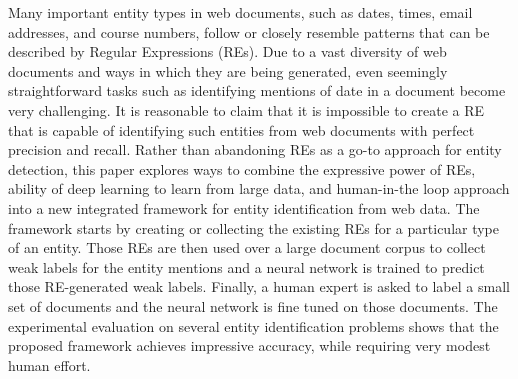Many important entity types in web documents, such as dates, times, email addresses, and course numbers, follow or closely resemble patterns that can be described by Regular Expressions (REs).  Due to a vast diversity of web documents and ways in which they are being generated, even seemingly straightforward tasks such as identifying mentions of date in a document become very challenging. It is reasonable to claim that it is impossible to create a RE that is capable of identifying such entities from web documents with perfect precision and recall. Rather than abandoning REs as a go-to approach for entity detection, this paper explores ways to combine the expressive power of REs, ability of deep learning to learn from large data, and human-in-the loop approach into a new integrated framework for entity identification from web data. The framework starts by creating or collecting the existing REs for a particular type of an entity. Those REs are then used over a large document corpus to collect weak labels for the entity mentions and a neural network is trained to predict those RE-generated weak labels. Finally, a human expert is asked to label a small set of documents and the neural network is fine tuned on those documents. The experimental evaluation on several entity identification problems shows that the proposed framework achieves impressive accuracy, while requiring very modest human effort.
